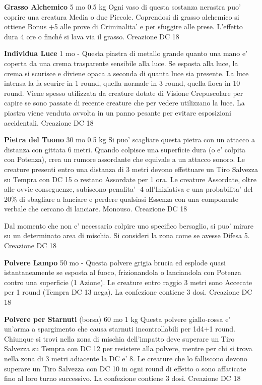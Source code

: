 \documentclass[a4paper,11pt,twoside,openany]{dndbook}
\begin{document}
{\textbf{Grasso Alchemico} 5 mo 0.5 kg Ogni vaso di questa sostanza nerastra puo' coprire una creatura Media o due Piccole. Coprendosi di grasso alchemico si ottiene Bonus +5 alle prove di Criminalita' e per sfuggire alle prese. L'effetto dura 4 ore o finché si lava via il grasso. Creazione DC 18

\textbf{Individua Luce} 1 mo - Questa piastra di metallo grande quanto una mano e' coperta da una crema trasparente sensibile alla luce. Se esposta alla luce, la crema si scurisce e diviene opaca a seconda di quanta luce sia presente. La luce intensa la fa scurire in 1 round, quella normale in 3 round, quella fioca in 10 round. Viene spesso utilizzata da creature dotate di Visione Crepuscolare per capire se sono passate di recente creature che per vedere utilizzano la luce. La piastra viene venduta avvolta in un panno pesante per evitare esposizioni accidentali. Creazione DC 18

\textbf{Pietra del Tuono} 30 mo 0.5 kg Si puo' scagliare questa pietra con un attacco a distanza con gittata 6 metri. Quando colpisce una superficie dura (o e' colpita con Potenza), crea un rumore assordante che equivale a un attacco sonoro. Le creature presenti entro una distanza di 3 metri devono effettuare un Tiro Salvezza su Tempra con DC 15 o restano Assordate per 1 ora. Le creature Assordate, oltre alle ovvie conseguenze, subiscono penalita' -4 all'Iniziativa e una probabilita' del 20\% di sbagliare a lanciare e perdere qualsiasi Essenza con una componente verbale che cercano di lanciare. Monouso. Creazione DC 18

Dal momento che non e' necessario colpire uno specifico bersaglio, si puo' mirare su un determinato area di mischia. Si consideri la zona come se avesse Difesa 5. Creazione DC 18

\textbf{Polvere Lampo} 50 mo - Questa polvere grigia brucia ed esplode quasi istantaneamente se esposta al fuoco, frizionandola o lanciandola con Potenza contro una superficie (1 Azione). Le creature entro raggio 3 metri sono Accecate per 1 round (Tempra DC 13 nega). La confezione contiene 3 dosi. Creazione DC 18

\textbf{Polvere per Starnuti} (borsa) 60 mo 1 kg Questa polvere giallo-rossa e' un'arma a spargimento che causa starnuti incontrollabili per 1d4+1 round. Chiunque si trovi nella zona di mischia dell'impatto deve superare un Tiro Salvezza su Tempra con DC 12 per resistere alla polvere, mentre per chi si trova nella zona di 3 metri adiacente la DC e' 8. Le creature che lo falliscono devono superare un Tiro Salvezza con DC 10 in ogni round di effetto o sono affaticate fino al loro turno successivo. La confezione contiene 3 dosi. Creazione DC 18

}
\end{document}
